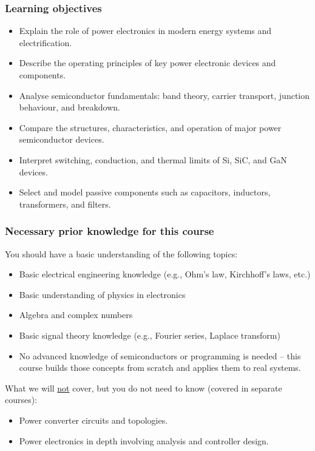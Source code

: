 \begin{frame}
	\frametitle{Learning objectives}
	\begin{itemize}
		\item Explain the role of power electronics in modern energy systems and electrification.
		\item Describe the operating principles of key power electronic devices and components.
		\item Analyse semiconductor fundamentals: band theory, carrier transport, junction behaviour, and breakdown.
		\item Compare the structures, characteristics, and operation of major power semiconductor devices.
		\item Interpret switching, conduction, and thermal limits of Si, SiC, and GaN devices.
		\item Select and model passive components such as capacitors, inductors, transformers, and filters.
	\end{itemize}
\end{frame}

\begin{frame}
	\frametitle{Necessary prior knowledge for this course}
	You should have a basic understanding of the following topics:
	\begin{itemize}
		\item Basic electrical engineering knowledge (e.g., Ohm's law, Kirchhoff's laws, etc.)
		\item Basic understanding of physics in electronics
		\item Algebra and complex numbers
		\item Basic signal theory knowledge (e.g., Fourier series, Laplace transform)
		\item No advanced knowledge of semiconductors or programming is needed -- this course builds those concepts from scratch and applies them to real systems.
	\end{itemize}
	\vspace{0.5cm}
	What we will \underline{not} cover, but you do not need to know (covered in separate courses):
	\begin{itemize}
		\item Power converter circuits and topologies.
		\item Power electronics in depth involving analysis and controller design. 
	\end{itemize}
\end{frame}

